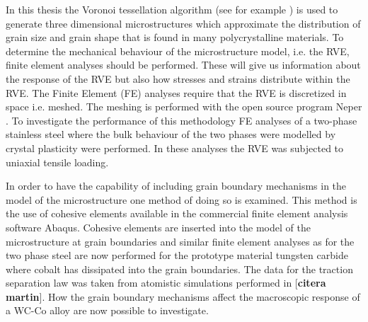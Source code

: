 \documentclass[introduction.tex]{subfiles}
\begin{document}
In this thesis the Voronoi tessellation algorithm (see for example \cite{voro}) is used to generate three dimensional microstructures which approximate the distribution of grain size and grain shape that is found in many polycrystalline materials. To determine the mechanical behaviour of the microstructure model, i.e. the RVE, finite element analyses should be performed. These will give us information about the response of the RVE but also how stresses and strains distribute within the RVE. The Finite Element (FE) analyses require that the RVE is discretized in space i.e. meshed. The meshing is performed with the open source program Neper \cite{Quey20111729}.  To investigate the performance of this methodology FE analyses of a two-phase stainless steel where the bulk behaviour of the two phases were modelled by crystal plasticity were performed. In these analyses the RVE was subjected to uniaxial tensile loading.

In order to have the capability of including grain boundary mechanisms in the model of the microstructure one method of doing so is examined. This method is the use of cohesive elements available in the commercial finite element analysis software Abaqus. Cohesive elements are inserted into the model of the microstructure at grain boundaries and similar finite element analyses as for the two phase steel are now performed for the prototype material tungsten carbide where cobalt has dissipated into the grain boundaries. The data for the traction separation law was taken from atomistic simulations performed in [\textbf{citera martin}]. How the grain boundary mechanisms affect the macroscopic response of a WC-Co alloy are now possible to investigate.
\end{document}

